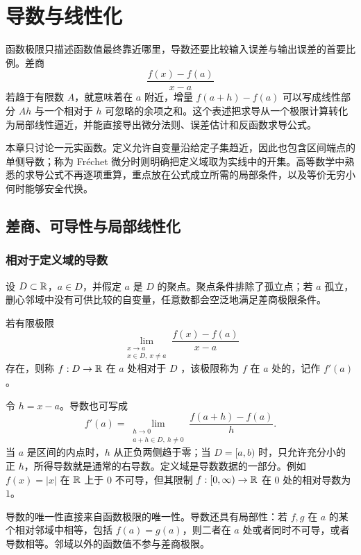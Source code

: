 \chapter{导数与线性化}
\label{chap:derivative-linearization}

函数极限只描述函数值最终靠近哪里，导数还要比较输入误差与输出误差的首要比例。差商
\[
 \frac{f(x)-f(a)}{x-a}
\]
若趋于有限数 \(A\)，就意味着在 \(a\) 附近，增量 \(f(a+h)-f(a)\) 可以写成线性部分 \(Ah\) 与一个相对于 \(h\) 可忽略的余项之和。这个表述把求导从一个极限计算转化为局部线性逼近，并能直接导出微分法则、误差估计和反函数求导公式。

本章只讨论一元实函数。定义允许自变量沿给定子集趋近，因此也包含区间端点的单侧导数；称为 Fréchet 微分时则明确把定义域取为实线中的开集。高等数学中熟悉的求导公式不再逐项重算，重点放在公式成立所需的局部条件，以及等价无穷小何时能够安全代换。

\section{差商、可导性与局部线性化}

\subsection{相对于定义域的导数}

设 \(D\subset\mathbb{R}\)，\(a\in D\)，并假定 \(a\) 是 \(D\) 的聚点。聚点条件排除了孤立点；若 \(a\) 孤立，删心邻域中没有可供比较的自变量，任意数都会空泛地满足差商极限条件。

\begin{definition}[导数]
若有限极限
\[
 \lim_{\substack{x\to a\\x\in D,\ x\ne a}}
 \frac{f(x)-f(a)}{x-a}
\]
存在，则称 \(f:D\to\mathbb{R}\) 在 \(a\) 处相对于 \(D\) ，该极限称为 \(f\) 在 \(a\) 处的，记作 \(f'(a)\)。
\end{definition}

令 \(h=x-a\)。导数也可写成
\[
 f'(a)=\lim_{\substack{h\to0\\a+h\in D,\ h\ne0}}
 \frac{f(a+h)-f(a)}{h}.
\]
当 \(a\) 是区间的内点时，\(h\) 从正负两侧趋于零；当 \(D=[a,b)\) 时，只允许充分小的正 \(h\)，所得导数就是通常的右导数。定义域是导数数据的一部分。例如 \(f(x)=|x|\) 在 \(\mathbb{R}\) 上于 \(0\) 不可导，但其限制 \(f:[0,\infty)\to\mathbb{R}\) 在 \(0\) 处的相对导数为 \(1\)。

导数的唯一性直接来自函数极限的唯一性。导数还具有局部性：若 \(f,g\) 在 \(a\) 的某个相对邻域中相等，包括 \(f(a)=g(a)\)，则二者在 \(a\) 处或者同时不可导，或者导数相等。邻域以外的函数值不参与差商极限。

